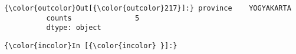 \documentclass[11pt]{article}
\begin{document}
\begin{Verbatim}[commandchars=\\\{\}]
{\color{outcolor}Out[{\color{outcolor}217}]:} province    YOGYAKARTA
          counts               5
          dtype: object
\end{Verbatim}
            
    \begin{Verbatim}[commandchars=\\\{\}]
{\color{incolor}In [{\color{incolor} }]:} 
\end{Verbatim}


    
    
    
    
\end{document}
